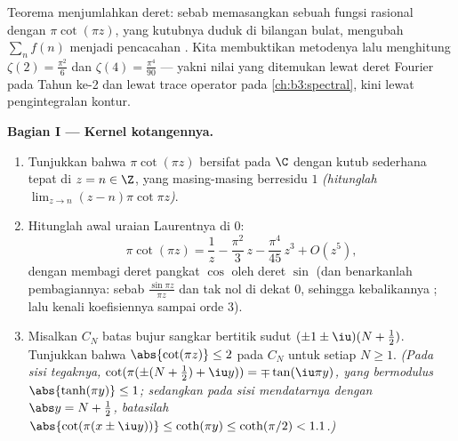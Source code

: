 \begin{problem}\label{pb:b3:residues:1}
Teorema  menjumlahkan deret: sebab memasangkan sebuah fungsi rasional
dengan $\pi\cot(\pi z)$, yang kutubnya duduk di bilangan bulat, mengubah
$\sum_{n}f(n)$ menjadi pencacahan . Kita membuktikan metodenya lalu
menghitung $\zeta(2) = \frac{\pi^2}{6}$ dan $\zeta(4) =
\frac{\pi^4}{90}$ --- yakni nilai yang ditemukan lewat deret Fourier pada
Tahun ke-2 dan lewat trace operator pada \cref{ch:b3:spectral}, kini lewat
pengintegralan kontur.

\medskip
\noindent\textbf{Bagian I --- Kernel kotangennya.}
\begin{enumerate}
  \item Tunjukkan bahwa $\pi\cot(\pi z)$ bersifat  pada $\C$ dengan
        kutub sederhana tepat di $z = n \in \Z$, yang masing-masing
        berresidu $1$ \emph{(hitunglah
        $\lim_{z\to n}(z-n)\pi\cot\pi z$)}.
  \item Hitunglah awal uraian Laurentnya di $0$:
        \[
        \pi\cot(\pi z) = \frac1z - \frac{\pi^2}{3}\,z -
        \frac{\pi^4}{45}\,z^3 + O(z^5) ,
        \]
        dengan membagi deret pangkat $\cos$ oleh deret $\sin$ (dan benarkanlah
        pembagiannya: sebab $\frac{\sin\pi z}{\pi z}$
         dan tak nol di dekat $0$, sehingga
        kebalikannya ; lalu kenali koefisiennya
        sampai orde $3$).
  \item Misalkan $C_N$ batas bujur sangkar bertitik sudut
        $(\pm1\pm\iu)(N + \frac12)$. Tunjukkan bahwa
        $\abs{\cot(\pi z)} \leq 2$ pada $C_N$ untuk setiap $N \geq
        1$. \emph{(Pada sisi tegaknya, $\cot(\pi(\pm(N +
        \frac12) + \iu y)) = \mp\tan(\iu\pi y)$, yang bermodulus
        $\abs{\tanh(\pi y)} \leq 1$; sedangkan pada sisi mendatarnya
        dengan $\abs y = N + \frac12$, batasilah
        $\abs{\cot(\pi(x\pm\iu y))} \leq \coth(\pi y) \leq
        \coth(\pi/2) < 1.1$.)}
\end{enumerate}


\end{problem}
